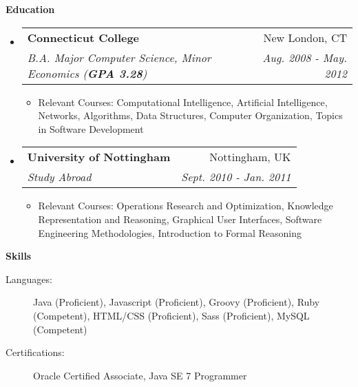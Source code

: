 \documentclass[letterpaper,11pt]{article}
\makeatletter
\newcommand{\resitem}[1]{\item #1 \vspace{-2pt}}
\newcommand{\resheading}[1]{{\large \colorbox{mygrey}{\begin{minipage}{\textwidth}{\textbf{#1 \vphantom{p\^{E}}}}\end{minipage}}}}
\newcommand{\ressubheading}[4]{
\begin{tabular*}{7.0in}{l@{\extracolsep{\fill}}r}
		\textbf{#1} & #2 \\
		\textit{#3} & \textit{#4} \\
\end{tabular*}\vspace{-6pt}}
\makeatother
\begin{document}
\resheading{Education}
\begin{itemize}
	\item
	\ressubheading{Connecticut College}{New London, CT}{B.A. Major Computer Science, Minor Economics (\textbf{GPA 3.28})}{Aug. 2008 - May. 2012}
	\begin{itemize}
		\resitem{Relevant Courses: Computational Intelligence, Artificial Intelligence, Networks, Algorithms, Data Structures, Computer Organization, Topics in Software Development}
	\end{itemize}

	\item
	\ressubheading{University of Nottingham}{Nottingham, UK}{Study Abroad}{Sept. 2010 - Jan. 2011}
	\begin{itemize}
		\resitem{Relevant Courses: Operations Research and Optimization, Knowledge Representation and Reasoning, Graphical User Interfaces, Software Engineering Methodologies, Introduction to Formal Reasoning}
	\end{itemize}
\end{itemize}

\resheading{Skills}
\begin{description}
	\item[Languages:]
		Java (Proficient), Javascript (Proficient), Groovy (Proficient), Ruby (Competent), HTML/CSS (Proficient), Sass (Proficient), MySQL (Competent)
	\item[Certifications:]
		Oracle Certified Associate, Java SE 7 Programmer
\end{description}
\end{document}
